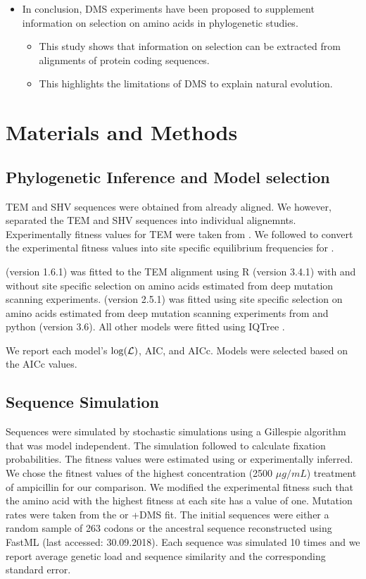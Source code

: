 \documentclass[12pt]{article}
\begin{document}
\begin{itemize}
	\item In conclusion, DMS experiments have been proposed to supplement information on selection on amino acids in phylogenetic studies.
	\begin{itemize}
		\item This study shows that information on selection can be extracted from alignments of protein coding sequences.
		\item This highlights the limitations of DMS to explain natural evolution.
	\end{itemize}
\end{itemize}


\section*{Materials and Methods}

\subsection*{Phylogenetic Inference and Model selection}

TEM and SHV sequences were obtained from \citet{bloom2017} already aligned.
We however, separated the TEM and SHV sequences into individual alignemnts.
Experimentally fitness values for TEM were taken from \citet{stiffler2016}.
We followed \citep{bloom2017} to convert the experimental fitness values into site specific equilibrium frequencies for \phydms. 

\selac (version 1.6.1) was fitted to the TEM alignment using R (version 3.4.1) \citep{rcore} with and without site specific selection on amino acids estimated from deep mutation scanning experiments.
\phydms (version 2.5.1) was fitted using site specific selection on amino acids estimated from deep mutation scanning experiments from \citet{stiffler2016} and python (version 3.6).
All other models were fitted using IQTree \citep{nguyen2015}.

We report each model's $\log(\mathcal{L})$, AIC, and  AICc. 
Models were selected based on the AICc values.

\subsection*{Sequence Simulation}

Sequences were simulated by stochastic simulations using a Gillespie algorithm \citep{gillespie1976} that was model independent.
The simulation followed \citet{SellaAndHirsh2005} to calculate fixation probabilities.
The fitness values were estimated using \selac or experimentally inferred.
We chose the fitnest values of the highest concentration (2500 $\mu g/mL$) treatment of ampicillin for our comparison.
We modified the experimental fitness such that the amino acid with the highest fitness at each site has a value of one.
Mutation rates were taken from the \selac or \selac+DMS fit.
The initial sequences were either a random sample of 263 codons or the ancestral sequence reconstructed using FastML \citep{fastml} (last accessed: 30.09.2018).
Each sequence was simulated 10 times and we report average genetic load and sequence similarity and the corresponding standard error.
\end{document}
